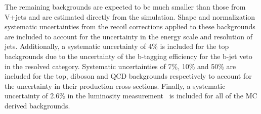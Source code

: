 The remaining backgrounds are expected to be much smaller than those from V+jets and are estimated directly from the simulation. 
Shape and normalization systematic uncertainties from the recoil corrections applied to these 
backgrounds are included to account for the uncertainty in the energy scale and resolution 
of jets. Additionally, a systematic uncertainty of 4\% is included for the top backgrounds due to the uncertainty of 
the b-tagging efficiency for the b-jet veto in the resolved category. Systematic uncertainties of 7\%, 10\% and 50\% are included for the top, diboson and QCD backgrounds respectively to account 
for the uncertainty in their production cross-sections. Finally, a systematic uncertainty of 2.6\% in the luminosity measurement~\cite{lumi} is included for 
all of the MC derived backgrounds.



